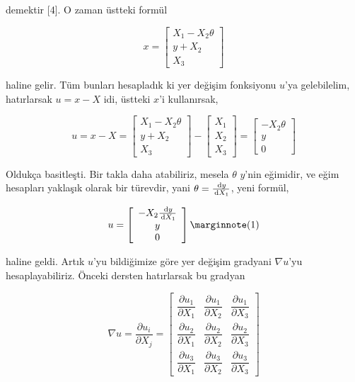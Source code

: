 \documentclass[12pt,fleqn]{article}\usepackage{../../common}
\begin{document}
demektir [4]. O zaman üstteki formül

$$
x = \left[\begin{array}{c}
X_1 - X_2 \theta \\ y + X_2 \\ X_3
\end{array}\right]
$$

haline gelir. Tüm bunları hesapladık ki yer değişim fonksiyonu $u$'ya
gelebilelim, hatırlarsak $u = x - X$ idi, üstteki $x$'i kullanırsak,

$$
u = x - X =
\left[\begin{array}{c}
X_1 - X_2 \theta \\ y + X_2 \\ X_3
\end{array}\right] -
\left[\begin{array}{ccc}
X_1 \\ X_2 \\ X_3
\end{array}\right] =
\left[\begin{array}{ccc}
-X_2 \theta \\ y \\ 0
\end{array}\right] 
$$

Oldukça basitleşti. Bir takla daha atabiliriz, mesela $\theta$ $y$'nin eğimidir,
ve eğim hesapları yaklaşık olarak bir türevdir, yani $\theta = \frac{\,\mathrm{d} y}{\,\mathrm{d} X_1}$,
yeni formül,

$$
u = \left[\begin{array}{ccc}
-X_2 \frac{\ud y}{\ud X_1} \\ y \\ 0
\end{array}\right]
\mlabel{1}
$$

haline geldi. Artık $u$'yu bildiğimize göre yer değişim gradyani $\nabla u$'yu
hesaplayabiliriz. Önceki dersten hatırlarsak bu gradyan

$$
\renewcommand*{\arraystretch}{2.5}
\nabla u = \frac{\partial u_i}{\partial X_j} =
\left[\begin{array}{ccc}
\dfrac{\partial u_1}{\partial X_1} & \dfrac{\partial u_1}{\partial X_2} & \dfrac{\partial u_1}{\partial X_3} \\
\dfrac{\partial u_2}{\partial X_1} & \dfrac{\partial u_2}{\partial X_2} & \dfrac{\partial u_2}{\partial X_3} \\
\dfrac{\partial u_3}{\partial X_1} & \dfrac{\partial u_3}{\partial X_2} & \dfrac{\partial u_3}{\partial X_3} 
\end{array}\right]
$$
\end{document}
